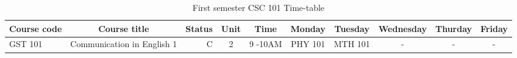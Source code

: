 \documentclass{article}
\begin{document}
\begin{sidewaystable}[h!]
\begin{center}
	\caption{First semester CSC 101 Time-table}
	\label{tab:table1}
	\begin{tabular}{l|c|r|c|c|c|c|c|c|c|}
		\textbf{Course code} & \textbf{Course title} & \textbf{Status} & \textbf{Unit} & \textbf{Time} & \textbf{Monday} & \textbf{Tuesday} & \textbf{Wednesday} &\textbf{Thurday} & \textbf{Friday}\\
		\hline
		GST 101 & Communication in English 1 & C & 2 & 9 -10AM & PHY 101 & MTH 101 & - & - & -\\
		
	\end{tabular}
\end{center}
\end{sidewaystable}
\end{document}
